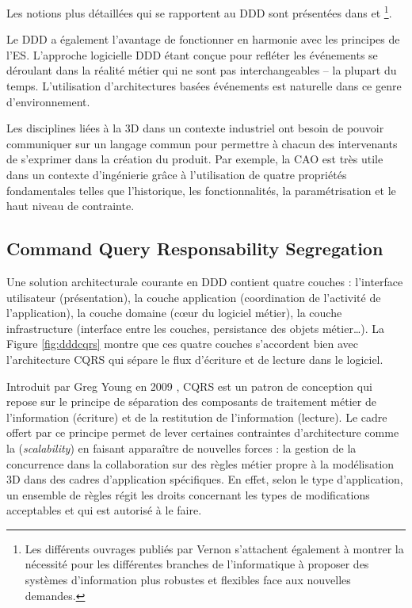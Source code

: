 Les notions plus détaillées qui se rapportent au \gls{DDD} sont présentées dans 
\cite{Evans2003} et \cite{Vernon2013}\footnote{Les différents ouvrages publiés par 
Vernon s'attachent également à montrer la nécessité pour les différentes 
branches de l'informatique à proposer des 
systèmes d'information plus robustes et flexibles face aux nouvelles demandes.}.

Le \gls{DDD} a également l'avantage de fonctionner en harmonie avec les 
principes de l'\gls{ES}. L'approche logicielle \gls{DDD} étant conçue pour refléter 
les événements se déroulant dans la réalité métier qui ne sont pas 
interchangeables -- la plupart du temps. L'utilisation d'architectures 
basées événements est naturelle dans ce genre d'environnement. 

Les disciplines liées à la 3D dans un contexte industriel ont besoin de pouvoir 
communiquer sur un langage commun pour permettre à chacun des 
intervenants de s'exprimer dans la création du produit. Par exemple, la \gls{CAO} 
est très utile dans un contexte d'ingénierie grâce à l'utilisation de quatre propriétés 
fondamentales telles que l'historique, les fonctionnalités, la paramétrisation et le 
haut niveau de contrainte.



\subsection{Command Query Responsability Segregation}
\label{sec:CQRS}
Une solution architecturale courante en \gls{DDD} contient quatre 
couches : l'interface utilisateur (présentation), la couche application (coordination 
de l'activité de l'application), la couche domaine (c\oe ur du logiciel métier), la 
couche infrastructure (interface entre les couches, persistance des objets 
métier\dots). La Figure \ref{fig:dddcqrs} montre que ces quatre couches s'accordent
bien avec l'architecture \gls{CQRS} qui sépare le flux d'écriture et de lecture dans 
le logiciel.

Introduit par Greg Young en 2009 \cite{Young2009}, \gls{CQRS} est un patron de 
conception qui repose sur le principe de séparation des composants de traitement 
métier de l'information (écriture) et de la restitution de l'information (lecture). Le 
cadre offert par ce principe permet de lever certaines contraintes d'architecture 
comme la (\textit{scalability}) en faisant apparaître de nouvelles forces : la gestion 
de la concurrence dans la collaboration sur des règles métier propre à la 
modélisation 3D dans des cadres d'application spécifiques. En effet, selon le type 
d'application, un ensemble de règles régit les droits concernant les types de 
modifications acceptables et qui est autorisé à le faire.

